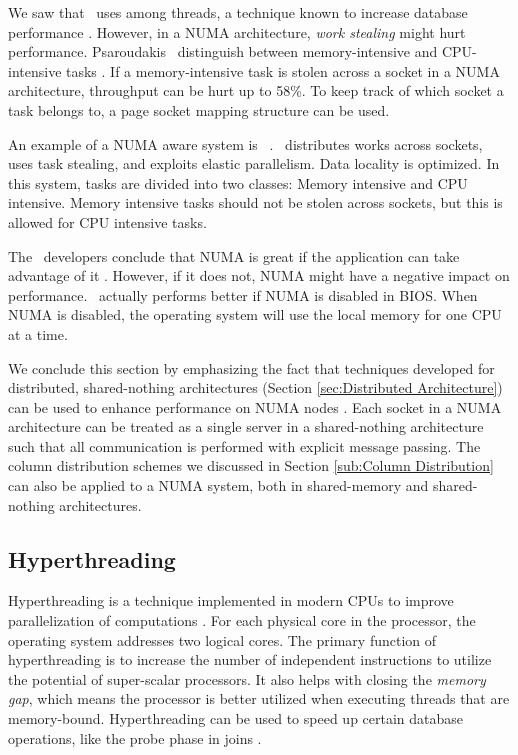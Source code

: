 We saw that \blink~uses  among threads, a technique known to increase database performance \cite{Barber2012-xt}. However, in a NUMA architecture, \textit{work stealing} might hurt performance. Psaroudakis \ea~distinguish between memory-intensive and CPU-intensive tasks \cite{Psaroudakis2015-lc}. If a memory-intensive task is stolen across a socket in a NUMA architecture, throughput can be hurt up to 58\%. To keep track of which socket a task belongs to, a page socket mapping structure can be used.

An example of a NUMA aware system is \hyper~\cite{Psaroudakis2014-ma, Psaroudakis2015-lc}. \hyper~distributes works across sockets,  uses task stealing, and exploits elastic parallelism. Data locality is optimized. In this system, tasks are divided into two classes: Memory intensive and CPU intensive. Memory intensive tasks should not be stolen across sockets, but this is allowed for CPU intensive tasks.

The \qlikview~developers conclude that NUMA is great if the application can take advantage of it \cite{Qlik2013-an}. However, if it does not, NUMA might have a negative impact on performance. \qlikview~actually performs better if NUMA is disabled in BIOS. When NUMA is disabled, the operating system will use the local memory for one CPU at a time.

We conclude this section by emphasizing the fact that techniques developed for distributed, shared-nothing architectures (Section \ref{sec:Distributed Architecture}) can be used to enhance performance on NUMA nodes \cite{Mukherjee2015-ul}. Each socket in a NUMA architecture can be treated as a single server in a shared-nothing architecture such that all communication is performed with explicit message passing. The column distribution schemes we discussed in Section \ref{sub:Column Distribution} can also be applied to a NUMA system, both in shared-memory and shared-nothing architectures.

\subsection{Hyperthreading}
\label{sub:Hyperthreading}
Hyperthreading is a technique implemented in modern CPUs to improve parallelization of computations \cite{Wikipedia_contributors2015-yx}. For each physical core in the processor, the operating system addresses two logical cores. The primary function of hyperthreading is to increase the number of independent instructions to utilize the potential of super-scalar processors. It also helps with closing the \textit{memory gap}, which means the processor is better utilized when executing threads that are memory-bound. Hyperthreading can be used to speed up certain database operations, like the probe phase in joins \cite{Barber2014-ey}.


